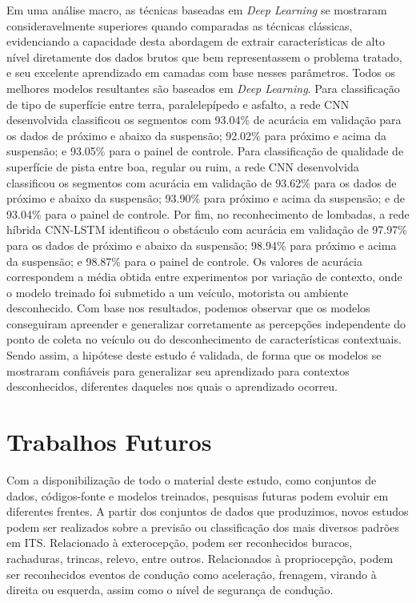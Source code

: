 Em uma análise macro, as técnicas baseadas em \textit{Deep Learning} se mostraram consideravelmente superiores quando comparadas as técnicas clássicas, evidenciando a capacidade desta abordagem de extrair características de alto nível diretamente dos dados brutos que bem representassem o problema tratado, e seu excelente aprendizado em camadas com base nesses parâmetros. Todos os melhores modelos resultantes são baseados em \textit{Deep Learning}. Para classificação de tipo de superfície entre terra, paralelepípedo e asfalto, a rede CNN desenvolvida classificou os segmentos com 93.04\% de acurácia em validação para os dados de próximo e abaixo da suspensão; 92.02\% para próximo e acima da suspensão; e 93.05\% para o painel de controle. Para classificação de qualidade de superfície de pista entre boa, regular ou ruim, a rede CNN desenvolvida classificou os segmentos com acurácia em validação de 93.62\% para os dados de próximo e abaixo da suspensão; 93.90\% para próximo e acima da suspensão; e de 93.04\% para o painel de controle. Por fim, no reconhecimento de lombadas, a rede híbrida CNN-LSTM identificou o obstáculo com acurácia em validação de 97.97\% para os dados de próximo e abaixo da suspensão; 98.94\% para próximo e acima da suspensão; e 98.87\% para o painel de controle. Os valores de acurácia correspondem a média obtida entre experimentos por variação de contexto, onde o modelo treinado foi submetido a um veículo, motorista ou ambiente desconhecido. Com base nos resultados, podemos observar que os modelos conseguiram apreender e generalizar corretamente as percepções independente do ponto de coleta no veículo ou do desconhecimento de características contextuais. Sendo assim, a hipótese deste estudo é validada, de forma que os modelos se mostraram confiáveis para generalizar seu aprendizado para contextos desconhecidos, diferentes daqueles nos quais o aprendizado ocorreu. 

\section{Trabalhos Futuros}

Com a disponibilização de todo o material deste estudo, como conjuntos de dados, códigos-fonte e modelos treinados, pesquisas futuras podem evoluir em diferentes frentes. A partir dos conjuntos de dados que produzimos, novos estudos podem ser realizados sobre a previsão ou classificação dos mais diversos padrões em ITS. Relacionado à exterocepção, podem ser reconhecidos buracos, rachaduras, trincas, relevo, entre outros. Relacionados à propriocepção, podem ser reconhecidos eventos de condução como aceleração, frenagem, virando à direita ou esquerda, assim como o nível de segurança de condução. 


